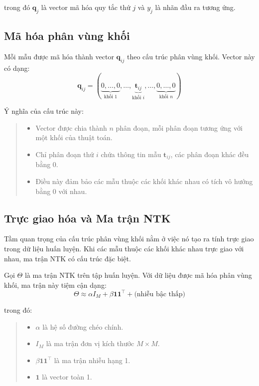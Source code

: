 trong đó $\mathbf{q}_j$ là vector mã hóa quy tắc thứ $j$ và $y_j$ là nhãn đầu ra tương ứng.

\subsection{Mã hóa phân vùng khối}

Mỗi mẫu được mã hóa thành vector $\mathbf{q}_{ij}$ theo cấu trúc phân vùng khối. Vector này có dạng:
\begin{equation}
    \mathbf{q}_{ij} = (\underbrace{0, \ldots, 0}_{\text{khối } 1}, \ldots, \underbrace{\mathbf{t}_{ij}}_{\text{khối } i}, \ldots, \underbrace{0, \ldots, 0}_{\text{khối } n})
\end{equation}

Ý nghĩa của cấu trúc này:
\begin{quote}
\begin{itemize}
    \item Vector được chia thành $n$ phân đoạn, mỗi phân đoạn tương ứng với một khối của thuật toán.
    \item Chỉ phân đoạn thứ $i$ chứa thông tin mẫu $\mathbf{t}_{ij}$, các phân đoạn khác đều bằng 0.
    \item Điều này đảm bảo các mẫu thuộc các khối khác nhau có tích vô hướng bằng 0 với nhau.
\end{itemize}
\end{quote}

\subsection{Trực giao hóa và Ma trận NTK}

Tầm quan trọng của cấu trúc phân vùng khối nằm ở việc nó tạo ra tính trực giao trong dữ liệu huấn luyện. Khi các mẫu thuộc các khối khác nhau trực giao với nhau, ma trận NTK có cấu trúc đặc biệt.

Gọi $\Theta$ là ma trận NTK trên tập huấn luyện. Với dữ liệu được mã hóa phân vùng khối, ma trận này tiệm cận dạng:
\begin{equation}
    \Theta \approx \alpha I_M + \beta \mathbf{1}\mathbf{1}^\top + \text{(nhiễu bậc thấp)}
\end{equation}

trong đó:
\begin{quote}
\begin{itemize}
    \item $\alpha$ là hệ số đường chéo chính.
    \item $I_M$ là ma trận đơn vị kích thước $M \times M$.
    \item $\beta \mathbf{1}\mathbf{1}^\top$ là ma trận nhiễu hạng 1.
    \item $\mathbf{1}$ là vector toàn 1.
\end{itemize}
\end{quote}

